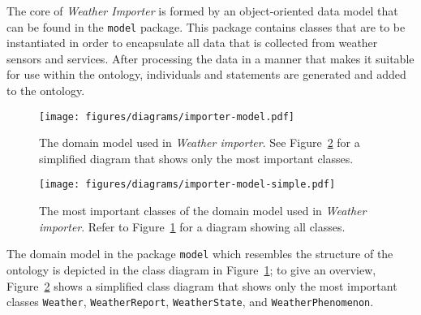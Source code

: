 The core of \emph{Weather Importer} is formed by an object-oriented data model that can be found in the \texttt{model} package. This package contains classes that are to be instantiated in order to encapsulate all data that is collected from weather sensors and services. After processing the data in a manner that makes it suitable for use within the \smarthomeweather ontology, individuals and statements are generated and added to the ontology.

\begin{figure}
\centering
\texttt{[image: figures/diagrams/importer-model.pdf]}
\caption[The domain model used in \emph{Weather importer}]{The domain model used in \emph{Weather importer}. See Figure~\ref{fig:importer_model2} for a simplified diagram that shows only the most important classes.}
\label{fig:importer_model1}
\end{figure}

\begin{figure}
\centering
\texttt{[image: figures/diagrams/importer-model-simple.pdf]}
\caption[The most important classes of the domain model of \emph{Weather importer}]{The most important classes of the domain model used in \emph{Weather importer}. Refer to Figure~\ref{fig:importer_model1} for a diagram showing all classes.}
\label{fig:importer_model2}
\end{figure}

The domain model in the package \texttt{model} which resembles the structure of the \smarthomeweather ontology is depicted in the  class diagram in Figure~\ref{fig:importer_model1}; to give an overview, Figure~\ref{fig:importer_model2} shows a simplified class diagram that shows only the most important classes \texttt{Weather}, \texttt{WeatherReport}, \texttt{WeatherState}, and \texttt{WeatherPhenomenon}.

